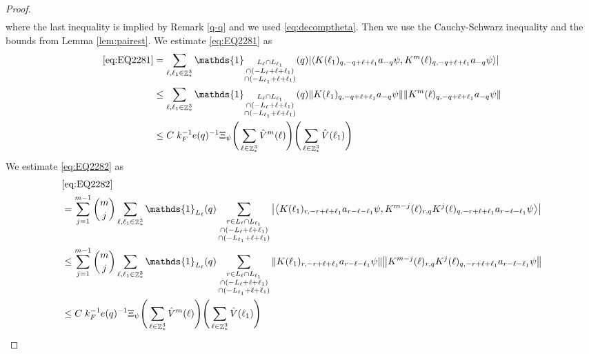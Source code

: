 \documentclass[sn-mathphys, Numbered ,a4paper]{sn-jnl}%
\DeclareMathOperator{\Z}{\mathbb{Z}}
\newcommand{\eva}[1]{\left\langle #1 \right\rangle}
\theoremstyle{plain}
\theoremstyle{definition}
\theoremstyle{remark}
\theoremstyle{plain}
\theoremstyle{definition}
\theoremstyle{remark}
\begin{document}
{\begin{proof}
\begin{align}
		\end{align}
		where the last inequality is implied by Remark \ref{q-q} and we used \eqref{eq:decomptheta}. Then we use the Cauchy-Schwarz inequality and the bounds from Lemma \ref{lem:pairest}.
		We estimate \eqref{eq:EQ2281} as 
		\begin{align}
			\eqref{eq:EQ2281}
			&= \sum\limits_{\ell, \ell_1\in \Z^3_*} \mathds{1}_{\substack{L_{\ell}\cap L_{\ell_1}\\\cap (-L_{\ell}+\ell+\ell_1) \\ \cap (-L_{\ell_1}+\ell+\ell_1)}}(q) \abs{\eva{ K(\ell_1)_{q,-q+\ell+\ell_1} a_{-q} \psi, K^m(\ell)_{q,-q+\ell+\ell_1} a_{-q} \psi }}\nonumber\\
			&\leq \sum\limits_{\ell, \ell_1\in \Z^3_*} \mathds{1}_{\substack{L_{\ell}\cap L_{\ell_1}\\\cap (-L_{\ell}+\ell+\ell_1) \\ \cap (-L_{\ell_1}+\ell+\ell_1)}}(q) \norm{ K(\ell_1)_{q,-q+\ell+\ell_1} a_{-q} \psi}\norm{ K^m(\ell)_{q,-q+\ell+\ell_1} a_{-q} \psi }\nonumber\\
			&\leq C\; k_F^{-1}e(q)^{-1} \Xi_{\psi} \Bigg(\sum\limits_{\ell \in \Z^3_*} \hat{V}^{m}(\ell) \Bigg)\Bigg(\sum\limits_{\ell \in \Z^3_*} \hat{V}(\ell_1)\Bigg)   \label{eq:estEQ2281}
		\end{align}
		We estimate \eqref{eq:EQ2282} as
		\begin{align}
			& \eqref{eq:EQ2282}\nonumber\\
			&= \sum\limits_{j=1}^{m-1} {{m}\choose j} \sum\limits_{\ell, \ell_1\in \Z^3_*}\mathds{1}_{L_{\ell}}(q) \sum\limits_{\substack{r\in L_{\ell} \cap L_{\ell_1}\\\cap (-L_{\ell}+\ell+\ell_1) \\ \cap (-L_{\ell_1}+\ell+\ell_1)}}  \abs{\eva{ K(\ell_1)_{r,-r+\ell+\ell_1} a_{r-\ell-\ell_1} \psi, K^{m-j}(\ell)_{r,q} K^j(\ell)_{q,-r+\ell+\ell_1} a_{r-\ell-\ell_1} \psi }}\nonumber\\
			&\leq \sum\limits_{j=1}^{m-1} {{m}\choose j} \sum\limits_{\ell, \ell_1\in \Z^3_*}\mathds{1}_{L_{\ell}}(q) \sum\limits_{\substack{r\in L_{\ell} \cap L_{\ell_1}\\\cap (-L_{\ell}+\ell+\ell_1) \\ \cap (-L_{\ell_1}+\ell+\ell_1)}}  \norm{ K(\ell_1)_{r,-r+\ell+\ell_1} a_{r-\ell-\ell_1} \psi} \norm{ K^{m-j}(\ell)_{r,q} K^j(\ell)_{q,-r+\ell+\ell_1} a_{r-\ell-\ell_1} \psi} \nonumber\\
			&\leq C\; k_F^{-1}e(q)^{-1} \Xi_{\psi} \Bigg(\sum\limits_{\ell \in \Z^3_*} \hat{V}^{m}(\ell) \Bigg)\Bigg(\sum\limits_{\ell \in \Z^3_*} \hat{V}(\ell_1)\Bigg) \label{eq:estEQ2282}

\end{align}
\end{proof}}
\end{document}
